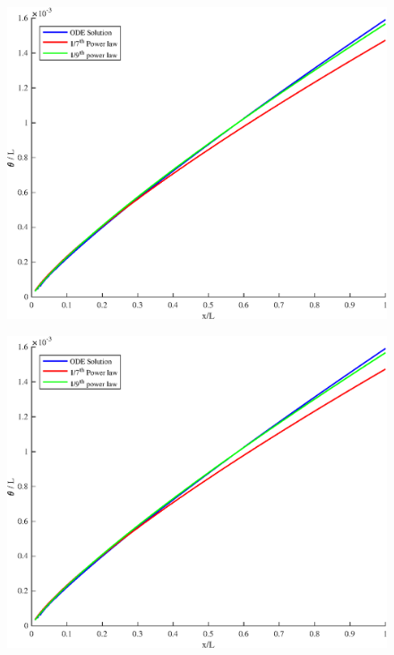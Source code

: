 \begin{figure}[H]
\centering
\includegraphics[scale=0.53]{week_2/graphs/e4g1.eps}
\caption{}
\label{e6g3}
\end{figure}

\begin{figure}[H]
\centering
\includegraphics[scale=0.53]{week_2/graphs/e4g1.eps}
\caption{}
\label{e6g4}
\end{figure}

